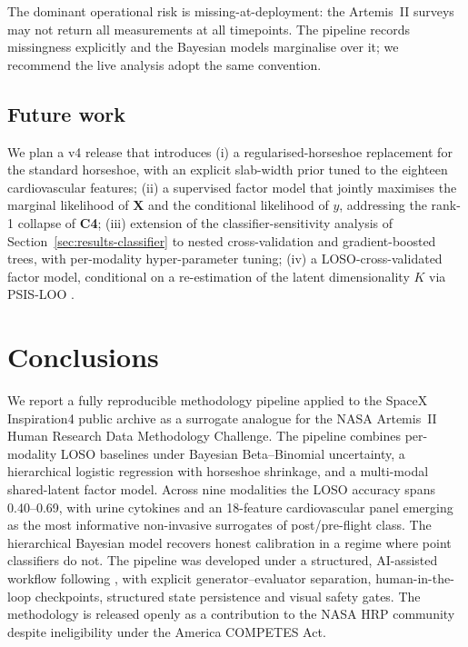 \documentclass[11pt,a4paper,3p,authoryear]{elsarticle}
\begin{document}
The dominant operational risk is missing-at-deployment: the Artemis~II surveys may not return all measurements at all timepoints. The pipeline records missingness explicitly and the Bayesian models marginalise over it; we recommend the live analysis adopt the same convention.

\subsection{Future work}

We plan a v4 release that introduces (i) a regularised-horseshoe \citep{Piironen2017regularised} replacement for the standard horseshoe, with an explicit slab-width prior tuned to the eighteen cardiovascular features; (ii) a supervised factor model that jointly maximises the marginal likelihood of $\mathbf{X}$ and the conditional likelihood of $y$, addressing the rank-1 collapse of \textbf{C4}; (iii) extension of the classifier-sensitivity analysis of Section~\ref{sec:results-classifier} to nested cross-validation and gradient-boosted trees, with per-modality hyper-parameter tuning; (iv) a LOSO-cross-validated factor model, conditional on a re-estimation of the latent dimensionality $K$ via PSIS-LOO \citep{Vehtari2017loocv}.

\section{Conclusions}\label{sec:conclusions}

We report a fully reproducible methodology pipeline applied to the SpaceX Inspiration4 public archive as a surrogate analogue for the NASA Artemis~II Human Research Data Methodology Challenge. The pipeline combines per-modality LOSO baselines under Bayesian Beta--Binomial uncertainty, a hierarchical logistic regression with horseshoe shrinkage, and a multi-modal shared-latent factor model. Across nine modalities the LOSO accuracy spans 0.40--0.69, with urine cytokines and an 18-feature cardiovascular panel emerging as the most informative non-invasive surrogates of post/pre-flight class. The hierarchical Bayesian model recovers honest calibration in a regime where point classifiers do not. The pipeline was developed under a structured, AI-assisted workflow following \citet{Zhou2026nora}, with explicit generator--evaluator separation, human-in-the-loop checkpoints, structured state persistence and visual safety gates. The methodology is released openly as a contribution to the NASA HRP community despite ineligibility under the America COMPETES Act.
\end{document}
